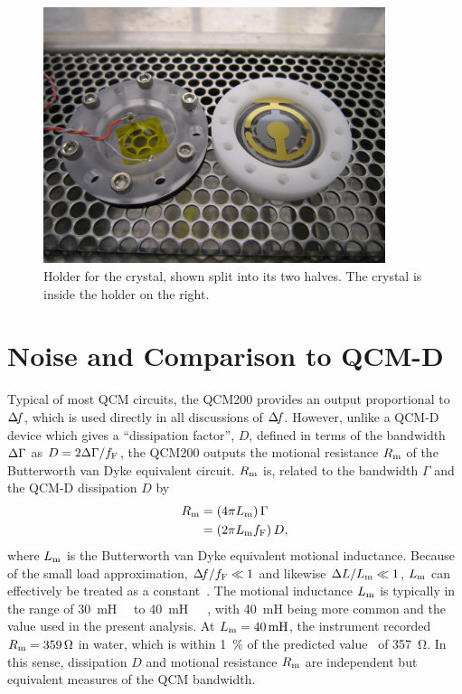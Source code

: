 \begin{figure}[ht]
\centering
\includegraphics[width=10cm,keepaspectratio]{qcm/figures/qcm_holderdiss.jpg}
\caption{Holder for the crystal, shown split into its two halves.  The
crystal is inside the holder on the right.}
\label{fig:cfqcmholder}
\end{figure}

\section{Noise and Comparison to QCM-D}\label{sec:suppqcmdcomp}
Typical of most QCM circuits, the QCM200 provides an output proportional to
$\Delta\!f$, which is used directly in all discussions of $\Delta\!f$.  However, unlike
a QCM-D device which gives a ``dissipation factor'', $D$, defined in
terms of the bandwidth $\Delta\Gamma$ as $D=2\Delta\Gamma/f_\mathrm{F}$, the QCM200
outputs the motional resistance $R_\mathrm{m}$ of the Butterworth van Dyke
equivalent circuit.  $R_\mathrm{m}$ is, related to
the bandwidth $\Gamma$ and the QCM-D dissipation $D$ by 
\begin{align}
 R_\mathrm{m}&=\left(4 \pi L_\mathrm{m}\right) \Gamma\\
 &=\left(2 \pi L_\mathrm{m} f_\mathrm{F}\right) D,
\end{align}
where $L_\mathrm{m}$ is the Butterworth van Dyke equivalent motional inductance.
Because of the small load approximation, $\Delta\!f/f_\mathrm{F} \ll 1$ and
likewise $\Delta L/L_\mathrm{m} \ll 1$, $L_\mathrm{m}$ can effectively be treated as a
constant~\cite{geelhood2002transient}.  The motional inductance $L_\mathrm{m}$ is
typically in the range of
\SI{30}{\milli\henry}~\cite{srsqcm200manual}~\cite{hussain2005ots} to
\SI{40}{\milli\henry}~\cite{gottschling2000detection}~\cite{arnau2002circuit}~\cite{snellings2001response},
with \SI{40}{\milli\henry} being more common and the value used in the
present analysis.  At $\Lm=\SI{40}{\milli\henry}$, the instrument recorded
$R_\mathrm{m}=\SI{359}{\ohm}$ in water, which is within \SI{1}{\percent} of the
predicted value~\cite{kanazawa1985frequency} of \SI{357}{\ohm}.  In this
sense, dissipation $D$ and motional resistance $R_\mathrm{m}$ are independent but
equivalent measures of the QCM bandwidth.


